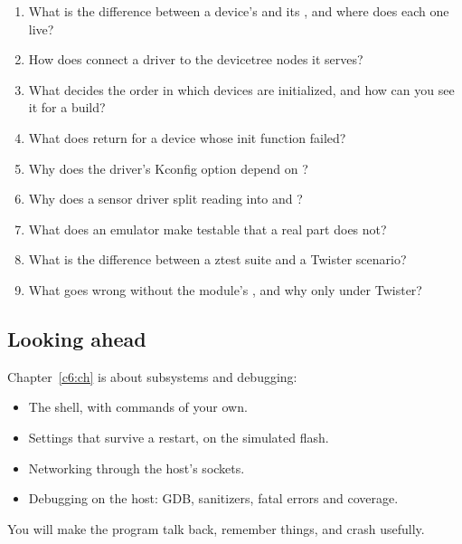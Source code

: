 \begin{enumerate}
  \item What is the difference between a device’s  and its , and where does each one
    live?
  \item How does  connect a driver to the devicetree nodes it serves?
  \item What decides the order in which devices are initialized, and how can you see it for a build?
  \item What does  return for a device whose init function failed?
  \item Why does the driver’s Kconfig option depend on ?
  \item Why does a sensor driver split reading into  and ?
  \item What does an emulator make testable that a real part does not?
  \item What is the difference between a ztest suite and a Twister scenario?
  \item What goes wrong without the module’s , and why only under Twister?
\end{enumerate}

\subsection*{Looking ahead}
Chapter~\ref{c6:ch} is about subsystems and debugging:

\begin{itemize}
  \item The shell, with commands of your own.
  \item Settings that survive a restart, on the simulated flash.
  \item Networking through the host’s sockets.
  \item Debugging on the host: GDB, sanitizers, fatal errors and coverage.
\end{itemize}

You will make the program talk back, remember things, and crash usefully.
